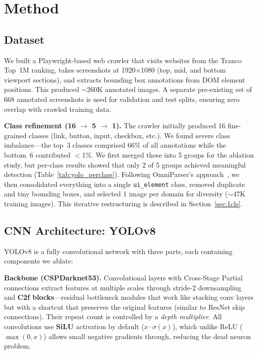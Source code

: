 \documentclass{article}
\begin{document}
\section{Method}

\subsection{Dataset}
\label{sec:dataset}

We built a Playwright-based web crawler that visits websites from the Tranco Top~1M ranking, takes screenshots at 1920$\times$1080 (top, mid, and bottom viewport sections), and extracts bounding box annotations from DOM element positions. This produced $\sim$260K annotated images. A separate pre-existing set of 668 annotated screenshots is used for validation and test splits, ensuring zero overlap with crawled training data.

\textbf{Class refinement (16 $\to$ 5 $\to$ 1).} The crawler initially produced 16 fine-grained classes (link, button, input, checkbox, etc.). We found severe class imbalance---the top~3 classes comprised 66\% of all annotations while the bottom~6 contributed $<$1\%. We first merged these into 5 groups for the ablation study, but per-class results showed that only 2 of 5 groups achieved meaningful detection (Table~\ref{tab:yolo_perclass}). Following OmniParser's approach~\cite{omniparser}, we then consolidated everything into a single \texttt{ui\_element} class, removed duplicate and tiny bounding boxes, and selected 1 image per domain for diversity ($\sim$47K training images). This iterative restructuring is described in Section~\ref{sec:1cls}.

\subsection{CNN Architecture: YOLOv8}
\label{sec:architecture}

YOLOv8 is a fully convolutional network with three parts, each containing components we ablate:

\textbf{Backbone (CSPDarknet53).} Convolutional layers with Cross-Stage Partial connections extract features at multiple scales through stride-2 downsampling and \textbf{C2f blocks}---residual bottleneck modules that work like stacking conv layers but with a shortcut that preserves the original features (similar to ResNet skip connections). Their repeat count is controlled by a \textit{depth multiplier}. All convolutions use \textbf{SiLU} activation by default ($x \cdot \sigma(x)$), which unlike ReLU ($\max(0,x)$) allows small negative gradients through, reducing the dead neuron problem.
\end{document}
